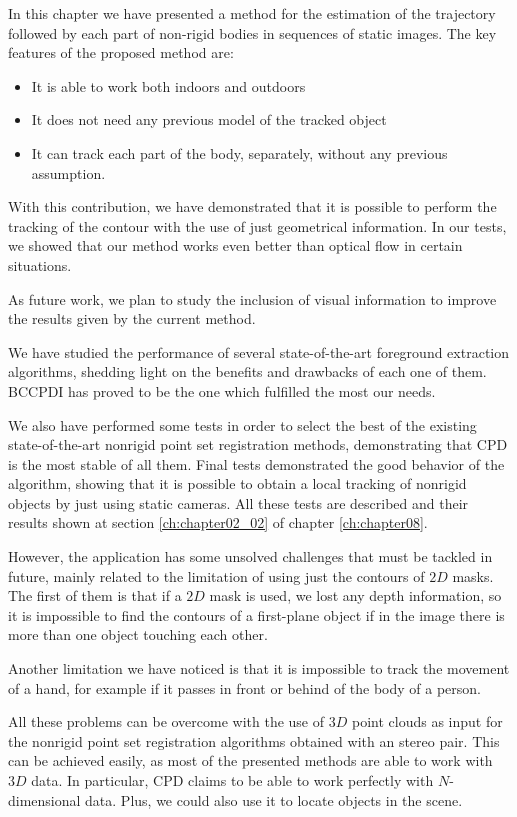 In this chapter we have presented a method for the estimation of the trajectory followed by each part of non-rigid bodies in sequences of static images. The key features of the proposed method are:
\begin{itemize}
 \item It is able to work both indoors and outdoors
 \item It does not need any previous model of the tracked object
 \item It can track each part of the body, separately, without any previous assumption.
\end{itemize}

With this contribution, we have demonstrated that it is possible to perform the tracking of the contour with the use of just geometrical information. In our tests, we showed that our method works even better than optical flow in certain situations. 

As future work, we plan to study the inclusion of visual information to improve the results given by the current method.

We have studied the performance of several state-of-the-art foreground extraction algorithms, shedding light on the 
benefits and drawbacks of each one of them. BCCPDI has proved to be the one which fulfilled the most our needs. 

We also have performed some tests in order to select the best of the existing state-of-the-art nonrigid point set registration methods, demonstrating that \ac{CPD} is the most stable of all them. Final tests demonstrated the good behavior of the algorithm, showing that it is possible to obtain a local tracking of nonrigid objects by just using static cameras. All these tests are described and their results shown at section \ref{ch:chapter02_02} of chapter \ref{ch:chapter08}.

However, the application has some unsolved challenges that must be tackled in future, mainly related to the 
limitation of using just the contours of $2D$ masks. The first of them is that if a  $2D$ mask is used, we lost any 
depth information, so it is impossible to find the contours of a first-plane object if in the image there is more than 
one object touching each other. 

Another limitation we have noticed is that it is impossible to track the movement of a hand, for example if it 
passes in front or behind of the body of a person. 

All these problems can be overcome with the use of $3D$ point clouds as input for the nonrigid point set registration 
algorithms obtained with an stereo pair. This can be achieved easily, as most of the presented methods are able to work 
with $3D$ data. In particular, \ac{CPD} claims to be able to work perfectly with $N$-dimensional data. Plus, we could also 
use it to locate objects in the scene.

